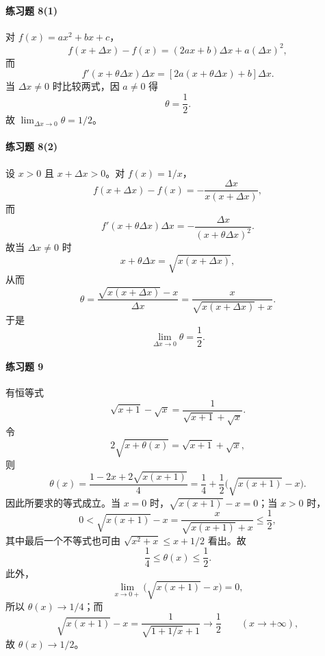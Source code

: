 \paragraph{练习题 8(1)}
\begin{xsolution}
对 $f(x)=ax^2+bx+c$，
\[
  f(x+\Delta x)-f(x)
  =(2ax+b)\Delta x+a(\Delta x)^2,
\]
而
\[
  f'(x+\theta\Delta x)\Delta x
  =[2a(x+\theta\Delta x)+b]\Delta x.
\]
当 $\Delta x\neq0$ 时比较两式，因 $a\neq0$ 得
\[
  \theta=\frac12.
\]
故 $\lim_{\Delta x\to0}\theta=1/2$。
\end{xsolution}

\paragraph{练习题 8(2)}
\begin{xsolution}
设 $x>0$ 且 $x+\Delta x>0$。对 $f(x)=1/x$，
\[
  f(x+\Delta x)-f(x)
  =-\frac{\Delta x}{x(x+\Delta x)},
\]
而
\[
  f'(x+\theta\Delta x)\Delta x
  =-\frac{\Delta x}{(x+\theta\Delta x)^2}.
\]
故当 $\Delta x\neq0$ 时
\[
  x+\theta\Delta x=\sqrt{x(x+\Delta x)},
\]
从而
\[
  \theta
  =\frac{\sqrt{x(x+\Delta x)}-x}{\Delta x}
  =\frac{x}{\sqrt{x(x+\Delta x)}+x}.
\]
于是
\[
  \lim_{\Delta x\to0}\theta=\frac12.
\]
\end{xsolution}

\paragraph{练习题 9}
\begin{xsolution}
有恒等式
\[
  \sqrt{x+1}-\sqrt{x}
  =\frac1{\sqrt{x+1}+\sqrt{x}}.
\]
令
\[
  2\sqrt{x+\theta(x)}=\sqrt{x+1}+\sqrt{x},
\]
则
\[
  \theta(x)
  =\frac{1-2x+2\sqrt{x(x+1)}}4
  =\frac14+\frac12\bigl(\sqrt{x(x+1)}-x\bigr).
\]
因此所要求的等式成立。当 $x=0$ 时，$\sqrt{x(x+1)}-x=0$；当 $x>0$ 时，
\[
  0<\sqrt{x(x+1)}-x
  =\frac{x}{\sqrt{x(x+1)}+x}\leqslant\frac12,
\]
其中最后一个不等式也可由 $\sqrt{x^2+x}\leqslant x+1/2$ 看出。故
\[
  \frac14\leqslant\theta(x)\leqslant\frac12.
\]
此外，
\[
  \lim_{x\to0+}\bigl(\sqrt{x(x+1)}-x\bigr)=0,
\]
所以 $\theta(x)\to1/4$；而
\[
  \sqrt{x(x+1)}-x
  =\frac1{\sqrt{1+1/x}+1}\to\frac12
  \qquad(x\to+\infty),
\]
故 $\theta(x)\to1/2$。
\end{xsolution}

